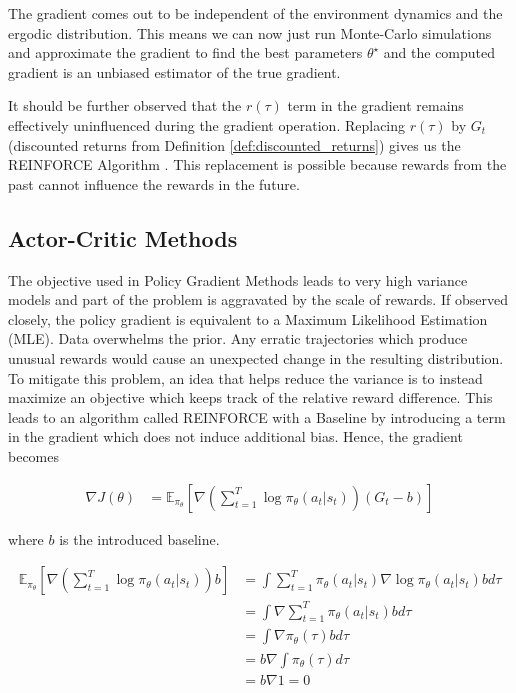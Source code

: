 \documentclass[12pt,a4paper]{article}
\begin{document}
The gradient comes out to be independent of the environment dynamics and the ergodic
distribution. This means we can now just run Monte-Carlo simulations and approximate the 
gradient to find the best parameters $\theta^\star$ and the computed gradient is an unbiased
estimator of the true gradient.

It should be further observed that the $r(\tau)$ term in the gradient remains effectively
uninfluenced during the gradient operation. Replacing $r(\tau)$ by $G_t$ (discounted
returns from Definition \ref{def:discounted_returns}) gives us the REINFORCE Algorithm 
\cite{williams1992simple}. This replacement is possible because rewards from the past cannot
influence the rewards in the future. 

\subsection{Actor-Critic Methods} \label{section:ac_methods}

The objective used in Policy Gradient Methods leads to very high variance models and part of
the problem is aggravated by the scale of rewards. If observed closely, the policy gradient is
equivalent to a Maximum Likelihood Estimation (MLE). Data overwhelms the prior. Any erratic
trajectories which produce unusual rewards would cause an unexpected change in the resulting
distribution. To mitigate this problem, an idea that helps reduce the variance is to
instead maximize an objective which keeps track of the relative reward difference. This leads
to an algorithm called REINFORCE with a Baseline by introducing a term in the gradient which
does not induce additional bias. Hence, the gradient becomes

\begin{align}
\nabla J(\theta) &= \mathbb{E}_{\pi_\theta}\left[ \nabla \left(\sum_{t=1}^T \log \pi_\theta(a_t|s_t) \right) (G_t - b) \right]
\end{align}

where $b$ is the introduced baseline.

\begin{align}
\mathbb{E}_{\pi_\theta}\left[ \nabla \left(\sum_{t=1}^T \log \pi_\theta(a_t|s_t) \right)b \right] &= \int  \sum_{t=1}^T \pi_\theta(a_t|s_t) \nabla \log \pi_\theta(a_t|s_t) b d\tau \\ \nonumber
&= \int  \nabla \sum_{t=1}^T \pi_\theta(a_t|s_t) b d\tau \\ \nonumber
&= \int \nabla \pi_\theta(\tau) b d\tau \\ \nonumber
&= b \nabla \int \pi_\theta(\tau) d\tau \\ \nonumber
&= b \nabla 1 = 0
\end{align}
\end{document}
